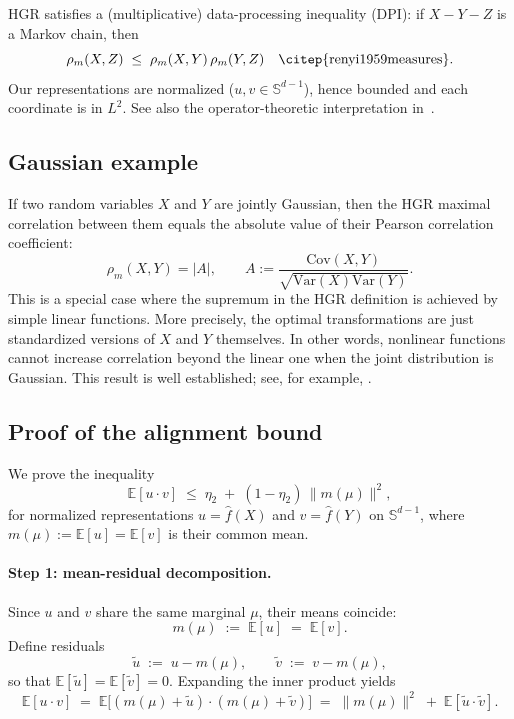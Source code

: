 \documentclass{article}
\newcommand{\E}{\mathbb{E}}
\newcommand{\Var}{\mathrm{Var}}
\newcommand{\Sph}{\mathbb{S}}
\begin{document}
HGR satisfies a (multiplicative) data-processing inequality (DPI): if $X - Y - Z$ is a Markov chain, then
\begin{equation}
\label{eq:hgr-dpi}
\rho_m(X,Z)\;\le\; \rho_m(X,Y)\,\rho_m(Y,Z)
\quad\text{\citep{renyi1959measures}}.
\end{equation}
%
Our representations are normalized ($u,v\in \Sph^{d-1}$), hence bounded and each coordinate is in $L^2$. See also the operator-theoretic interpretation in~\citep{anantharam2013maximal}.

\subsection{Gaussian example}
\label{app:hgr:gauss}

If two random variables \(X\) and \(Y\) are jointly Gaussian, then the HGR maximal correlation between them equals the absolute value of their Pearson correlation coefficient: 
\begin{equation}
\label{eq:hgr-gaussian}
\rho_m(X,Y) = |A|, \qquad A := \frac{\text{Cov}(X,Y)}{\sqrt{\Var(X)\Var(Y)}}.
\end{equation}
This is a special case where the supremum in the HGR definition is achieved by simple linear functions. More precisely, the optimal transformations are just standardized versions of \(X\) and \(Y\) themselves. In other words, nonlinear functions cannot increase correlation beyond the linear one when the joint distribution is Gaussian. This result is well established; see, for example, \citet{bryc2005maximum}.


\subsection{Proof of the alignment bound}
\label{app:hgr:align-proof}
We prove the inequality
\begin{equation}
\label{eq:align-goal}
\E[u \cdot v] \;\le\; \eta_2 \;+\; (1-\eta_2)\,\|m(\mu)\|^2 ,
\end{equation}
for normalized representations $u=\hat f(X)$ and $v=\hat f(Y)$ on $\Sph^{d-1}$, where $m(\mu):=\E[u]=\E[v]$ is their common mean.

\paragraph{Step 1: mean-residual decomposition.}
Since $u$ and $v$ share the same marginal $\mu$, their means coincide:
\begin{equation}
\label{eq:mean}
m(\mu) \;:=\; \E[u] \;=\; \E[v].
\end{equation}
Define residuals
\begin{equation}
\label{eq:residuals}
\tilde u \;:=\; u - m(\mu), 
\qquad 
\tilde v \;:=\; v - m(\mu),
\end{equation}
so that $\E[\tilde u]=\E[\tilde v]=0$. Expanding the inner product yields
\begin{equation}
\label{eq:decompose}
\E[u \cdot v]
\;=\; \E\big[(m(\mu)+\tilde u)\cdot(m(\mu)+\tilde v)\big]
\;=\; \|m(\mu)\|^2 \;+\; \E[\tilde u \cdot \tilde v] .
\end{equation}
\end{document}
